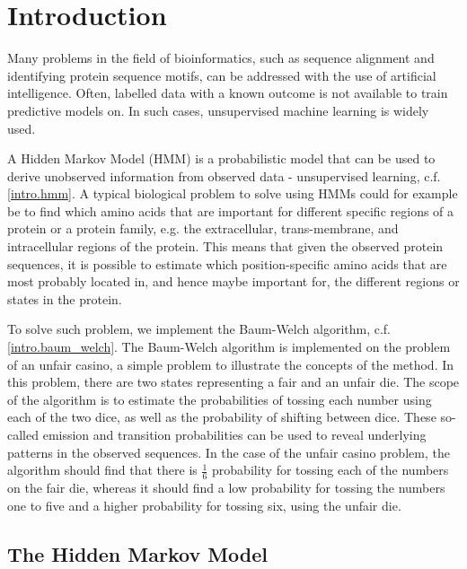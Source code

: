 
\section{Introduction}
Many problems in the field of bioinformatics, such as sequence alignment and identifying protein sequence motifs, can be addressed with the use of artificial intelligence. Often, labelled data with a known outcome is not available to train predictive models on. In such cases, unsupervised machine learning is widely used. 

A Hidden Markov Model (HMM) is a probabilistic model that can be used to derive unobserved information from observed data - unsupervised learning, c.f. \autoref{intro.hmm}. A typical biological problem to solve using HMMs could for example be to find which amino acids that are important for different specific regions of a protein or a protein family, e.g. the extracellular, trans-membrane, and intracellular regions of the protein. This means that given the observed protein sequences, it is possible to estimate which position-specific amino acids that are most probably located in, and hence maybe important for, the different regions or states in the protein. 

To solve such problem, we implement the Baum-Welch algorithm, c.f. \autoref{intro.baum_welch}. The Baum-Welch algorithm is implemented on the problem of an unfair casino, a simple problem to illustrate the concepts of the method. In this problem, there are two states representing a fair and an unfair die. The scope of the algorithm is to estimate the probabilities of tossing each number using each of the two dice, as well as the probability of shifting between dice. These so-called emission and transition probabilities can be used to reveal underlying patterns in the observed sequences. In the case of the unfair casino problem, the algorithm should find that there is $\frac{1}{6}$ probability for tossing each of the numbers on the fair die, whereas it should find a low probability for tossing the numbers one to five and a higher probability for tossing six, using the unfair die. 


\subsection{The Hidden Markov Model} \label{intro.hmm}

